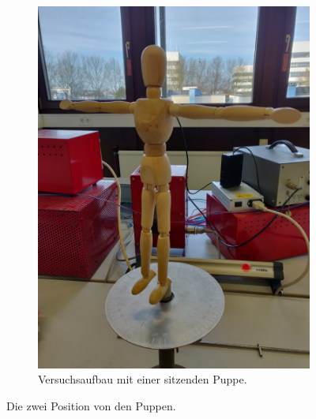 \begin{figure}
\begin{subfigure}{0.5\textwidth}
    \includegraphics[scale=0.1]{content/data/PuppeTPose2.png}
    \caption{Versuchsaufbau mit einer sitzenden Puppe.}
    \label{fig:puppetpose}
\end{subfigure}
\caption{Die zwei Position von den Puppen.}
\label{fig:puppen}
\end{figure}
\FloatBarrier

